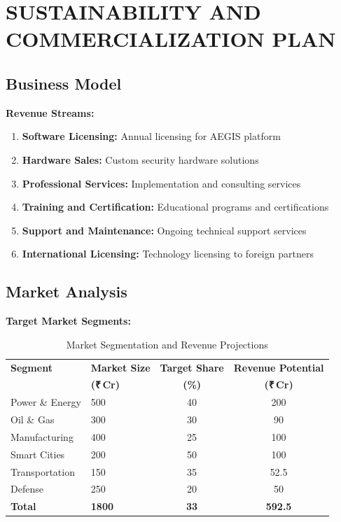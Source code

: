 \documentclass[12pt,a4paper]{article}
\newcommand{\rupees}{₹\,}
\begin{document}
\newpage

\section{SUSTAINABILITY AND COMMERCIALIZATION PLAN}

\subsection{Business Model}

\textbf{Revenue Streams:}
\begin{enumerate}
    \item \textbf{Software Licensing:} Annual licensing for AEGIS platform
    \item \textbf{Hardware Sales:} Custom security hardware solutions
    \item \textbf{Professional Services:} Implementation and consulting services
    \item \textbf{Training and Certification:} Educational programs and certifications
    \item \textbf{Support and Maintenance:} Ongoing technical support services
    \item \textbf{International Licensing:} Technology licensing to foreign partners
\end{enumerate}

\subsection{Market Analysis}

\textbf{Target Market Segments:}
\begin{table}[H]
\centering
\begin{tabular}{|p{3cm}|p{3cm}|c|c|}
\hline
\rowcolor{lightblue}
\textbf{Segment} & \textbf{Market Size} & \textbf{Target Share} & \textbf{Revenue Potential} \\
& \textbf{(\rupees Cr)} & \textbf{(\%)} & \textbf{(\rupees Cr)} \\
\hline

Power \& Energy & 500 & 40 & 200 \\
\hline

Oil \& Gas & 300 & 30 & 90 \\
\hline

Manufacturing & 400 & 25 & 100 \\
\hline

Smart Cities & 200 & 50 & 100 \\
\hline

Transportation & 150 & 35 & 52.5 \\
\hline

Defense & 250 & 20 & 50 \\
\hline

\rowcolor{yellow}
\textbf{Total} & \textbf{1800} & \textbf{33} & \textbf{592.5} \\
\hline

\end{tabular}
\caption{Market Segmentation and Revenue Projections}
\end{table}
\end{document}

